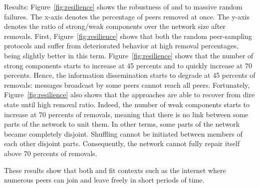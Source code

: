 \begin{asparadesc}
\item[Results:] Figure~\ref{fig:resilience} shows the robustness of \SPRAY and
  \CYCLON to massive random failures. The x-axis denotes the percentage of peers
  removed at once. The y-axis denotes the ratio of strong/weak components over
  the network size after removals. First, Figure~\ref{fig:resilience} shows that
  both the random peer-sampling protocols \SPRAY and \CYCLON suffer from
  deteriorated behavior at high removal percentages, \CYCLON being slightly
  better in this term. Figure~\ref{fig:resilience} shows that the number of
  strong components starts to increase at 45 percents and to quickly increase at
  70 percents. Hence, the information dissemination starts to degrade at 45
  percents of removals: messages broadcast by some peers cannot reach all peers.
  Fortunately, Figure~\ref{fig:resilience} also shows that the approaches are
  able to recover from dire state until high removal ratio. Indeed, the number
  of weak components starts to increase at 70 percents of removals, meaning that
  there is no link between some parts of the network to unit them. In other
  terms, some parts of the network became completely disjoint. Shuffling cannot
  be initiated between members of each other disjoint parts. Consequently, the
  network cannot fully repair itself above 70 percents of removals.

  These results show that both \SPRAY and \CYCLON fit contexts such as the
  internet where numerous peers can join and leave freely in short periods of
  time.


\end{asparadesc}
